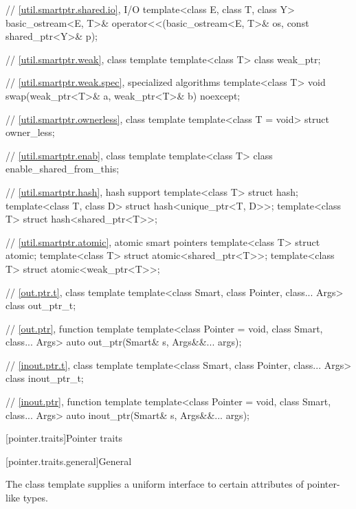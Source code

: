 \begin{codeblock}
{  // \ref{util.smartptr.shared.io},  I/O
  template<class E, class T, class Y>
    basic_ostream<E, T>& operator<<(basic_ostream<E, T>& os, const shared_ptr<Y>& p);

  // \ref{util.smartptr.weak}, class template 
  template<class T> class weak_ptr;

  // \ref{util.smartptr.weak.spec},  specialized algorithms
  template<class T> void swap(weak_ptr<T>& a, weak_ptr<T>& b) noexcept;

  // \ref{util.smartptr.ownerless}, class template 
  template<class T = void> struct owner_less;

  // \ref{util.smartptr.enab}, class template 
  template<class T> class enable_shared_from_this;

  // \ref{util.smartptr.hash}, hash support
  template<class T> struct hash;
  template<class T, class D> struct hash<unique_ptr<T, D>>;
  template<class T> struct hash<shared_ptr<T>>;

  // \ref{util.smartptr.atomic}, atomic smart pointers
  template<class T> struct atomic;
  template<class T> struct atomic<shared_ptr<T>>;
  template<class T> struct atomic<weak_ptr<T>>;

  // \ref{out.ptr.t}, class template 
  template<class Smart, class Pointer, class... Args>
    class out_ptr_t;

  // \ref{out.ptr}, function template 
  template<class Pointer = void, class Smart, class... Args>
    auto out_ptr(Smart& s, Args&&... args);

  // \ref{inout.ptr.t}, class template 
  template<class Smart, class Pointer, class... Args>
    class inout_ptr_t;

  // \ref{inout.ptr}, function template 
  template<class Pointer = void, class Smart, class... Args>
    auto inout_ptr(Smart& s, Args&&... args);
}
\end{codeblock}

[pointer.traits]{Pointer traits}

[pointer.traits.general]{General}

\pnum
The class template  supplies a uniform interface to certain
attributes of pointer-like types.

